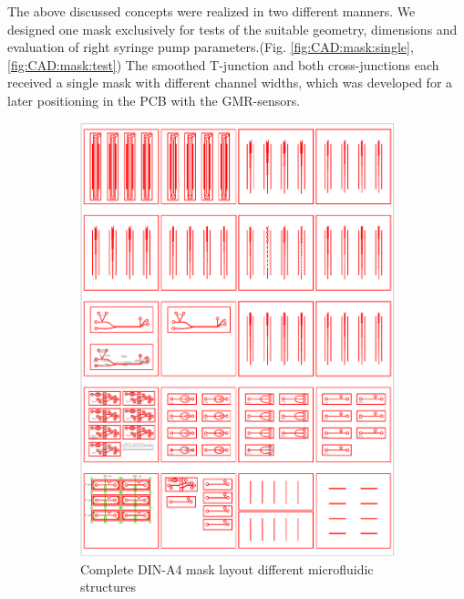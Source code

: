 The above discussed concepts were realized in two different manners. We designed one mask exclusively for tests of the suitable geometry, dimensions and evaluation of right syringe pump parameters.(Fig. \ref{fig:CAD:mask:single}, \ref{fig:CAD:mask:test}) The smoothed T-junction and both cross-junctions each received a single mask with different channel widths, which was developed for a later positioning in the PCB with the GMR-sensors.
\begin{figure}[h!]
	\vspace{-2cm}
	\begin{subfigure}[c]{\textwidth}
		\centering
		\includegraphics[clip,trim={0mm 0mm 0mm 0mm},scale=.3]{Ressourcen/IMG/Microfluidics_Prototype_3_2018412-A4}
		\caption{Complete DIN-A4 mask layout different microfluidic structures}
		\label{fig:CAD:mask:A4}
	\end{subfigure}
	\vfill
	\begin{subfigure}[c]{\textwidth}

\end{subfigure}
\end{figure}
